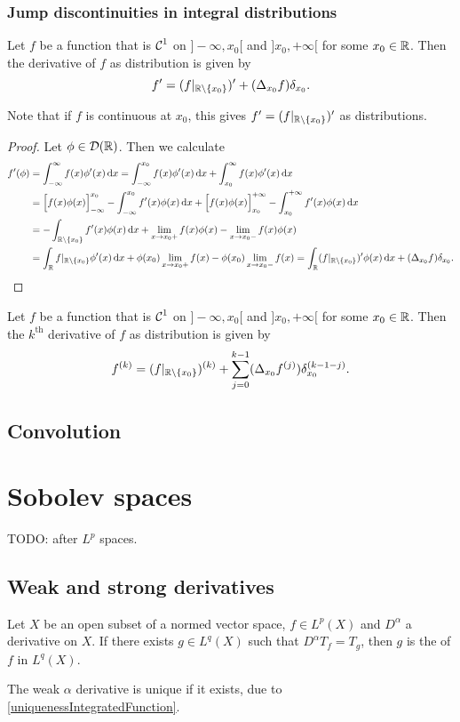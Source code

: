 \subsubsection{Jump discontinuities in integral distributions}
\begin{proposition}
Let $f$ be a function that is $\operatorname{\mathcal{C}}^1$ on $]-\infty, x_0[$ and $]x_0, +\infty[$ for some $x_0\in\mathbb{R}$. Then
the derivative of $f$ as distribution is given by
\[ f' = (f|_{\mathbb{R}\setminus\{x_0\}})' + (\Delta_{x_0}f)\delta_{x_0}. \]
\end{proposition}
Note that if $f$ is continuous at $x_0$, this gives $f' = (f|_{\mathbb{R}\setminus\{x_0\}})'$ as distributions.
\begin{proof}
Let $\phi\in\operatorname{\mathcal{D}}(\mathbb{R})$. Then we calculate
\begin{align*}
f'(\phi) &= \int_{-\infty}^\infty f(x)\phi'(x)\diff{x} = \int_{-\infty}^{x_0} f(x)\phi'(x)\diff{x} + \int_{x_0}^\infty f(x)\phi'(x)\diff{x} \\
&= \Big[f(x)\phi(x)\Big]_{-\infty}^{x_0} - \int_{-\infty}^{x_0} f'(x)\phi(x)\diff{x} + \Big[f(x)\phi(x)\Big]_{x_0}^{+\infty} - \int_{x_0}^{+\infty} f'(x)\phi(x)\diff{x} \\
&= -\int_{\R\setminus\{x_0\}} f'(x)\phi(x)\diff{x} + \lim_{x\to x_0+}f(x)\phi(x)-\lim_{x\to x_0-}f(x)\phi(x) \\
&= \int_{\R}f|_{\R\setminus\{x_0\}}\phi'(x)\diff{x} + \phi(x_0)\lim_{x\to x_0+}f(x)- \phi(x_0)\lim_{x\to x_0-}f(x) = \int_{\R}(f|_{\R\setminus\{x_0\}})'\phi(x)\diff{x} + (\Delta_{x_0}f)\delta_{x_0}.
\end{align*}
\end{proof}
\begin{corollary}
Let $f$ be a function that is $\operatorname{\mathcal{C}}^1$ on $]-\infty, x_0[$ and $]x_0, +\infty[$ for some $x_0\in\mathbb{R}$. Then
the $k^\text{th}$ derivative of $f$ as distribution is given by
\[ f^{(k)} = (f|_{\mathbb{R}\setminus\{x_0\}})^{(k)} + \sum_{j=0}^{k-1}(\Delta_{x_0}f^{(j)})\delta^{(k-1-j)}_{x_0}. \]
\end{corollary}

\subsection{Convolution}


\section{Sobolev spaces}
TODO: after $L^p$ spaces.
\subsection{Weak and strong derivatives}
\begin{definition}
    Let $X$ be an open subset of a normed vector space, $f\in L^p(X)$ and $D^\alpha$ a derivative on $X$. If there exists $g\in L^q(X)$ such that $D^\alpha T_f = T_g$, then $g$ is the  of $f$ in $L^q(X)$.
\end{definition}
The weak $\alpha$ derivative is unique if it exists, due to \ref{uniquenessIntegratedFunction}.

